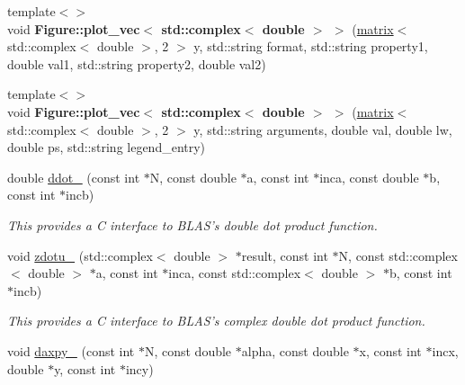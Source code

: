 \begin{DoxyCompactItemize}
\item 
\hypertarget{namespacekeycpp_a43b2f640a46183a8e275102a588ffeea}{{\footnotesize template$<$$>$ }\\void {\bfseries Figure\-::plot\-\_\-vec$<$ std\-::complex$<$ double $>$ $>$} (\hyperlink{classkeycpp_1_1matrix}{matrix}$<$ std\-::complex$<$ double $>$, 2 $>$ y, std\-::string format, std\-::string property1, double val1, std\-::string property2, double val2)}\label{namespacekeycpp_a43b2f640a46183a8e275102a588ffeea}

\item 
\hypertarget{namespacekeycpp_add1149c17f57b55ed5b5cedaea1cc069}{{\footnotesize template$<$$>$ }\\void {\bfseries Figure\-::plot\-\_\-vec$<$ std\-::complex$<$ double $>$ $>$} (\hyperlink{classkeycpp_1_1matrix}{matrix}$<$ std\-::complex$<$ double $>$, 2 $>$ y, std\-::string arguments, double val, double lw, double ps, std\-::string legend\-\_\-entry)}\label{namespacekeycpp_add1149c17f57b55ed5b5cedaea1cc069}

\item 
\hypertarget{namespacekeycpp_a55e50932cc54f92bdd7e38c6438f4f1f}{double \hyperlink{namespacekeycpp_a55e50932cc54f92bdd7e38c6438f4f1f}{ddot\-\_\-} (const int $\ast$N, const double $\ast$a, const int $\ast$inca, const double $\ast$b, const int $\ast$incb)}\label{namespacekeycpp_a55e50932cc54f92bdd7e38c6438f4f1f}

\begin{DoxyCompactList}\small\item\em This provides a C interface to B\-L\-A\-S's double dot product function. \end{DoxyCompactList}\item 
\hypertarget{namespacekeycpp_a2ce99b4fe4a13b9c70ada81761eb0ca2}{void \hyperlink{namespacekeycpp_a2ce99b4fe4a13b9c70ada81761eb0ca2}{zdotu\-\_\-} (std\-::complex$<$ double $>$ $\ast$result, const int $\ast$N, const std\-::complex$<$ double $>$ $\ast$a, const int $\ast$inca, const std\-::complex$<$ double $>$ $\ast$b, const int $\ast$incb)}\label{namespacekeycpp_a2ce99b4fe4a13b9c70ada81761eb0ca2}

\begin{DoxyCompactList}\small\item\em This provides a C interface to B\-L\-A\-S's complex double dot product function. \end{DoxyCompactList}\item 
\hypertarget{namespacekeycpp_ae99c5b242a21ba683701ccb6ab6534b1}{void \hyperlink{namespacekeycpp_ae99c5b242a21ba683701ccb6ab6534b1}{daxpy\-\_\-} (const int $\ast$N, const double $\ast$alpha, const double $\ast$x, const int $\ast$incx, double $\ast$y, const int $\ast$incy)}\label{namespacekeycpp_ae99c5b242a21ba683701ccb6ab6534b1}


\end{DoxyCompactItemize}
